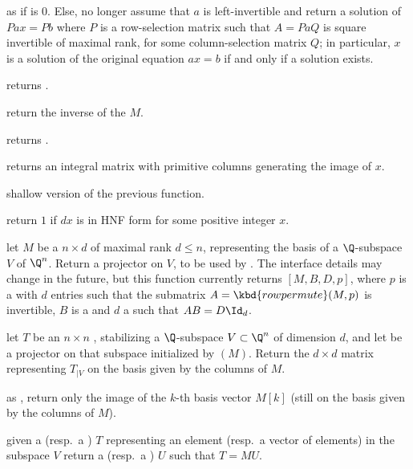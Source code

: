  as  if
 is $0$. Else, no longer assume that $a$ is left-invertible and
return a solution of $P a x = P b$ where $P$ is a row-selection matrix
such that $A = P a Q$ is square invertible of maximal rank, for some
column-selection matrix $Q$; in particular, $x$ is a solution of
the original equation $a x = b$ if and only if a solution exists.

 returns .

 return the inverse of the  $M$.

 returns .

 returns an integral matrix with primitive columns
generating the image of $x$.

 shallow version of the previous function.

 return $1$ if $d x$ is in HNF form for some
positive integer $x$.


 let $M$ be a  $n\times d$  of
maximal rank $d \leq n$, representing the basis of a $\Q$-subspace
$V$ of $\Q^n$. Return a projector on $V$, to be used by .
The interface details may change in the future, but this function currently
returns $[M, B,D,p]$, where $p$ is a  with $d$ entries
such that the submatrix $A = \kbd{rowpermute}(M,p)$ is invertible, $B$ is a
 and $d$ a  such that $A B = D \Id_d$.

 let $T$ be an $n\times n$
, stabilizing a $\Q$-subspace $V\subset \Q^n$ of dimension $d$, and
let  be a projector on that subspace initialized by
$(M)$. Return the $d\times d$ matrix representing $T_{|V}$
on the basis given by the columns of $M$.

 as
, return only the image of the $k$-th basis vector $M[k]$
(still on the basis given by the columns of $M$).

 given a  (resp.~a )
$T$ representing an element (resp.~a vector of elements) in the subspace $V$
return a  (resp.~a ) $U$ such that $T = MU$.


